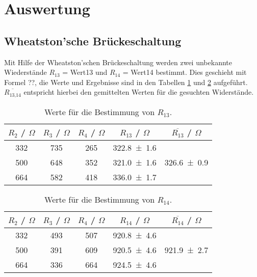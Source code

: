 \section{Auswertung}
\label{sec:Auswertung}

\subsection{Wheatston'sche Brückeschaltung}
Mit Hilfe der Wheatston'schen Brückeschaltung werden zwei unbekannte Wiederstände $R_{13}$ = Wert13 und $R_{14}$ = Wert14 bestimmt. Dies geschieht mit Formel ??, die Werte und Ergebnisse sind in den Tabellen \ref{tab:Wheat1} und \ref{tab:Wheat2} aufgeführt. $\overline{R_\text{13,14}}$ entspricht hierbei den gemittelten Werten für die gesuchten Widerstände.
\begin{table}[H]
  \centering
  \begin{tabular}{c c c c c}
    \toprule
    $R_2$ / $\Omega$ & $R_3$ / $\Omega$ & $R_4$ / $\Omega$ & $R_{13}$ / $\Omega$ & $\overline{R_{13}}$ / $\Omega$ \\
    \midrule
    332 & 735 & 265 & \num{322.8 +- 1.6} &  \\
    500 & 648 & 352 & \num{321.0 +- 1.6} &  \num{326.6 +- 0.9}\\
    664 & 582 & 418 & \num{336.0 +- 1.7} &  \\
  \end{tabular}
  \caption{Werte für die Bestimmung von $R_{13}$.}
  \label{tab:Wheat1}
\end{table}

\begin{table}[H]
  \centering
  \begin{tabular}{c c c c c}
    \toprule
    $R_2$ / $\Omega$ & $R_3$ / $\Omega$ & $R_4$ / $\Omega$ & $R_{14}$ / $\Omega$ & $\overline{R_{14}}$ / $\Omega$ \\
    \midrule
    332 & 493 & 507 & \num{920.8 +- 4.6} &  \\
    500 & 391 & 609 & \num{920.5 +- 4.6} &  \num{921.9 +- 2.7}\\
    664 & 336 & 664 & \num{924.5 +- 4.6} &  \\
  \end{tabular}
  \caption{Werte für die Bestimmung von $R_{14}$.}
  \label{tab:Wheat2}
\end{table}

